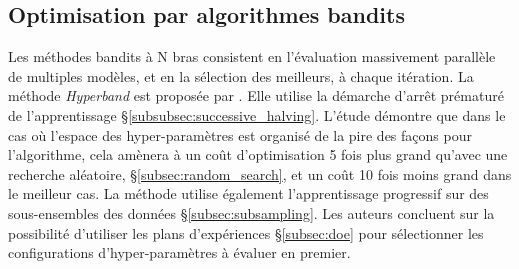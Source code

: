 \subsection{Optimisation par algorithmes bandits} \label{subsec:bandit}
Les méthodes bandits à N bras consistent en l'évaluation massivement parallèle de multiples modèles, et en la sélection des meilleurs, à chaque itération.
La méthode \textit{Hyperband} est proposée par \cite{li_hyperband_2016}.
Elle utilise la démarche d'arrêt prématuré de l'apprentissage §\ref{subsubsec:successive_halving}.
L'étude démontre que dans le cas où l'espace des hyper-paramètres est organisé de la pire des façons pour l'algorithme, cela amènera à un coût d'optimisation 5 fois plus grand qu'avec une recherche aléatoire, §\ref{subsec:random_search}, et un coût 10 fois moins grand dans le meilleur cas.
La méthode utilise également l'apprentissage progressif sur des sous-ensembles des données §\ref{subsec:subsampling}.
Les auteurs concluent sur la possibilité d'utiliser les plans d'expériences §\ref{subsec:doe} pour sélectionner les configurations d'hyper-paramètres à évaluer en premier.
%
%

